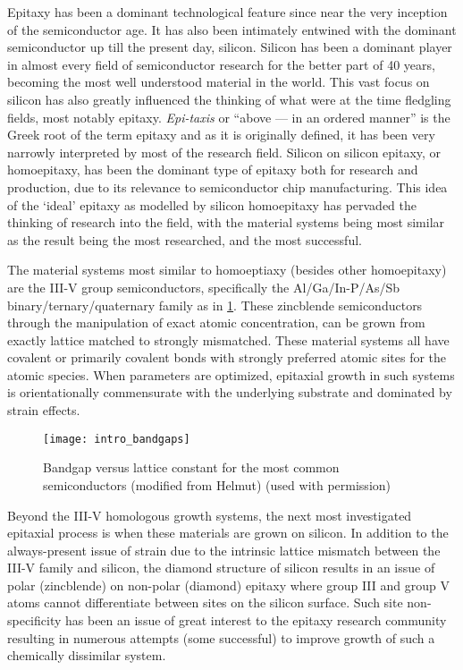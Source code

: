 Epitaxy has been a dominant technological feature since near the very inception of the semiconductor age.
It has also been intimately entwined with the dominant semiconductor up till the present day, silicon.
Silicon has been a dominant player in almost every field of semiconductor research for the better part of 40 years, becoming the most well understood material in the world.
This vast focus on silicon has also greatly influenced the thinking of what were at the time fledgling fields, most notably epitaxy.
\emph{Epi-taxis} or ``above --- in an ordered manner'' is the Greek root of the term epitaxy and as it is originally defined, it has been very narrowly interpreted by most of the research field.
Silicon on silicon epitaxy, or homoepitaxy, has been the dominant type of epitaxy both for research and production, due to its relevance to semiconductor chip manufacturing.
This idea of the `ideal' epitaxy as modelled by silicon homoepitaxy has pervaded the thinking of research into the field, with the material systems being most similar as the result being the most researched, and the most successful.

The material systems most similar to homoeptiaxy (besides other homoepitaxy) are the III-V group semiconductors, specifically the Al/Ga/In-P/As/Sb bi\-nary/ter\-nary/qua\-ter\-nary family as in \cref{fig:intro_bandgaps}.
These zincblende semiconductors through the manipulation of exact atomic concentration, can be grown from exactly lattice matched to strongly mismatched.
These material systems all have covalent or primarily covalent bonds with strongly preferred atomic sites for the atomic species.
When parameters are optimized, epitaxial growth in such systems is orientationally commensurate with the underlying substrate and dominated by strain effects.
\begin{figure}
 \centering \texttt{[image: intro\_bandgaps]}
 \caption[Bandgap versus lattice constant]{\label{fig:intro_bandgaps}Bandgap versus lattice constant for the most common semiconductors (modified from Helmut\cite{HelmutFoll2013}) (used with permission)}
\end{figure}

Beyond the III-V homologous growth systems, the next most investigated epitaxial process is when these materials are grown on silicon.
In addition to the always-present issue of strain due to the intrinsic lattice mismatch between the III-V family and silicon, the diamond structure of silicon results in an issue of polar (zincblende) on non-polar (diamond) epitaxy\cite{Kroemer1987} where group III and group V atoms cannot differentiate between sites on the silicon surface.
Such site non-specificity has been an issue of great interest to the epitaxy research community resulting in numerous attempts (some successful)\cite{Kroemer1987} to improve growth of such a chemically dissimilar system.

